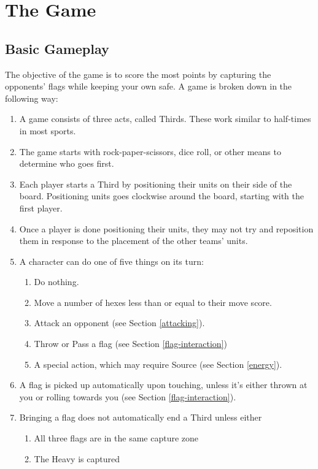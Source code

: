 \chapter{The Game}
\section{Basic Gameplay} \label{basic-gameplay}
The objective of the game is to score the most points by capturing the opponents' flags while keeping your own safe.
A game is broken down in the following way:
\begin{enumerate}
    \item A game consists of three acts, called Thirds.
    These work similar to half-times in most sports.
    \item The game starts with rock-paper-scissors, dice roll, or other means to determine who goes first.
    \item Each player starts a Third by positioning their units on their side of the board.
    Positioning units goes clockwise around the board, starting with the first player.
    \item Once a player is done positioning their units, they may not try and reposition them in response to the placement of the other teams’ units.
    \item A character can do one of five things on its turn:
    \begin{enumerate}
        \item Do nothing.
        \item Move a number of hexes less than or equal to their move score.
        \item Attack an opponent (see Section \ref{attacking}).
        \item Throw or Pass a flag (see Section \ref{flag-interaction})
        \item A special action, which may require Source (see Section \ref{energy}).
    \end{enumerate}
    \item A flag is picked up automatically upon touching, unless it’s either thrown at you or rolling towards you (see Section \ref{flag-interaction}).
    \item Bringing a flag does not automatically end a Third unless either
    \begin{enumerate}
        \item All three flags are in the same capture zone
        \item The Heavy is captured
    \end{enumerate}
\end{enumerate}







